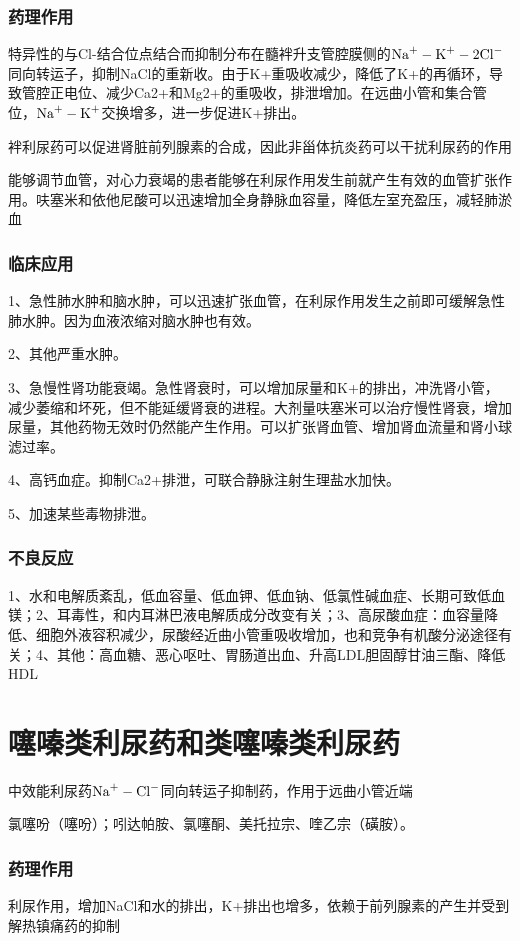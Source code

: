 \documentclass[UTF8]{ctexbook}
\begin{document}
\subsubsection{药理作用}特异性的与Cl-结合位点结合而抑制分布在髓袢升支管腔膜侧的\(\textup{Na}^{+}-\textup{K}^{+}-\textup{2Cl}^{-}\)同向转运子，抑制NaCl的重新收。由于K+重吸收减少，降低了K+的再循环，导致管腔正电位、减少Ca2+和Mg2+的重吸收，排泄增加。在远曲小管和集合管位，\(\textup{Na}^{+}-\textup{K}^{+}\)交换增多，进一步促进K+排出。

袢利尿药可以促进肾脏前列腺素的合成，因此非甾体抗炎药可以干扰利尿药的作用

能够调节血管，对心力衰竭的患者能够在利尿作用发生前就产生有效的血管扩张作用。呋塞米和依他尼酸可以迅速增加全身静脉血容量，降低左室充盈压，减轻肺淤血
\subsubsection{临床应用}
1、急性肺水肿和脑水肿，可以迅速扩张血管，在利尿作用发生之前即可缓解急性肺水肿。因为血液浓缩对脑水肿也有效。

2、其他严重水肿。

3、急慢性肾功能衰竭。急性肾衰时，可以增加尿量和K+的排出，冲洗肾小管，减少萎缩和坏死，但不能延缓肾衰的进程。大剂量呋塞米可以治疗慢性肾衰，增加尿量，其他药物无效时仍然能产生作用。可以扩张肾血管、增加肾血流量和肾小球滤过率。

4、高钙血症。抑制Ca2+排泄，可联合静脉注射生理盐水加快。

5、加速某些毒物排泄。
\subsubsection{不良反应}
1、水和电解质紊乱，低血容量、低血钾、低血钠、低氯性碱血症、长期可致低血镁；2、耳毒性，和内耳淋巴液电解质成分改变有关；3、高尿酸血症：血容量降低、细胞外液容积减少，尿酸经近曲小管重吸收增加，也和竞争有机酸分泌途径有关；4、其他：高血糖、恶心呕吐、胃肠道出血、升高LDL胆固醇甘油三酯、降低HDL
\section{噻嗪类利尿药和类噻嗪类利尿药}中效能利尿药\(\textup{Na}^{+}-\textup{Cl}^{-}\)同向转运子抑制药，作用于远曲小管近端

氯噻吩（噻吩）；吲达帕胺、氯噻酮、美托拉宗、喹乙宗（磺胺）。
\subsubsection{药理作用}
利尿作用，增加NaCl和水的排出，K+排出也增多，依赖于前列腺素的产生并受到解热镇痛药的抑制
\end{document}
